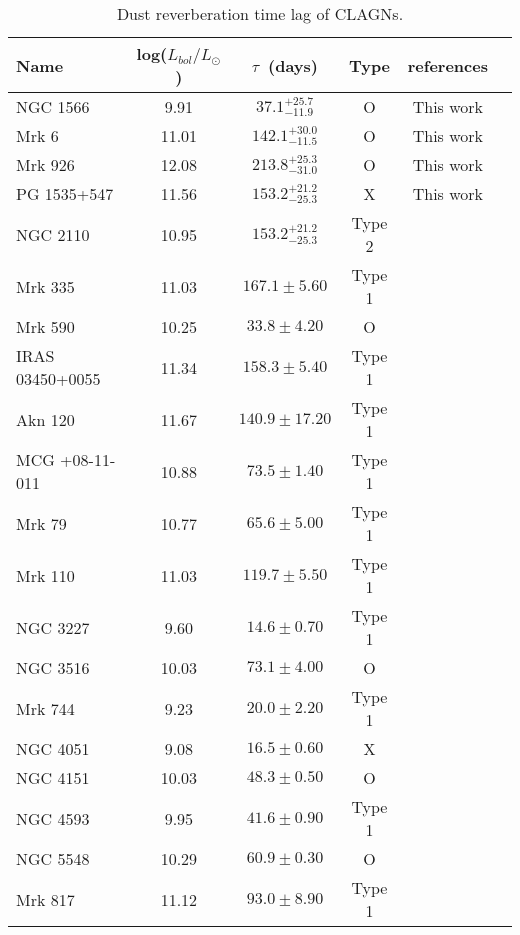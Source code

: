 \begin{table}
 \caption{Dust reverberation time lag of CLAGNs.
}
 \label{table_lag}
 \begin{center}
 \begin{tabular}{lccccc}
 \hline\hline
Name & log($L_{bol}/L_{\odot}$) & $\tau$~(days) &Type  & references\\ \hline 
NGC 1566 & 9.91 & $37.1^{+25.7}_{-11.9}$ & O & This work \\
Mrk 6 & 11.01 & $142.1^{+30.0}_{-11.5}$ & O & This work \\
Mrk 926 & 12.08 & $213.8^{+25.3}_{-31.0}$ & O & This work \\
PG 1535+547 & 11.56 & $153.2^{+21.2}_{-25.3}$ & X & This work \\
NGC 2110 & 10.95 & $153.2^{+21.2}_{-25.3}$ & Type 2 & \citet{2020MNRAS.495.2921N} \\
Mrk 335 & 11.03 & $ 167.1 \pm 5.60$ & Type 1 & \citet{2014ApJ...788..159K} \\
Mrk 590 & 10.25 & $ 33.8 \pm 4.20$ & O & \citet{2014ApJ...788..159K} \\
IRAS 03450+0055 & 11.34 & $ 158.3 \pm 5.40$ & Type 1 & \citet{2014ApJ...788..159K} \\
Akn 120 & 11.67 & $ 140.9 \pm 17.20$ & Type 1 & \citet{2014ApJ...788..159K} \\
MCG +08-11-011 & 10.88 & $ 73.5 \pm 1.40$ & Type 1 & \citet{2014ApJ...788..159K} \\
Mrk 79 & 10.77 & $ 65.6 \pm 5.00$ & Type 1 & \citet{2014ApJ...788..159K} \\
Mrk 110 & 11.03 & $ 119.7 \pm 5.50$ & Type 1 & \citet{2014ApJ...788..159K} \\
NGC 3227 & 9.60 & $ 14.6 \pm 0.70$ & Type 1 & \citet{2014ApJ...788..159K} \\
NGC 3516 & 10.03 & $ 73.1 \pm 4.00$ & O & \citet{2014ApJ...788..159K} \\
Mrk 744 & 9.23 & $ 20.0 \pm 2.20$ & Type 1 & \citet{2014ApJ...788..159K} \\
NGC 4051 & 9.08 & $ 16.5 \pm 0.60$ & X & \citet{2014ApJ...788..159K} \\
NGC 4151 & 10.03 & $ 48.3 \pm 0.50$ & O & \citet{2014ApJ...788..159K} \\
NGC 4593 & 9.95 & $ 41.6 \pm 0.90$ & Type 1 & \citet{2014ApJ...788..159K} \\
NGC 5548 & 10.29 & $ 60.9 \pm 0.30$ & O & \citet{2014ApJ...788..159K} \\
Mrk 817 & 11.12 & $ 93.0 \pm 8.90$ & Type 1 & \citet{2014ApJ...788..159K} \\

\end{tabular}
\end{center}
\end{table}
